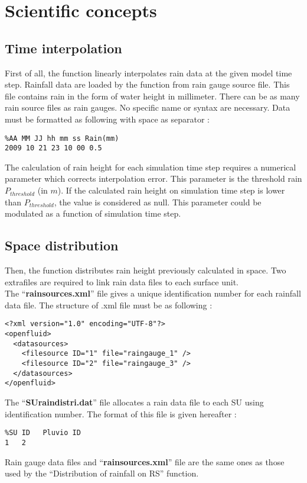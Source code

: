 \section{Scientific concepts}
\subsection{Time interpolation}
First of all, the function linearly interpolates rain data at the given model time step. Rainfall data are loaded by the function from rain gauge source file. This file contains rain in the form of water height in millimeter. There can be as many rain source files as rain gauges. No specific name or syntax are necessary. Data must be formatted as following with space as separator :
\begin{verbatim}
%AA MM JJ hh mm ss Rain(mm)
2009 10 21 23 10 00 0.5
\end{verbatim}

The calculation of rain height for each simulation time step requires a numerical parameter which corrects interpolation error. This parameter is the threshold rain $P_{threshold}$ (in $m$). If the calculated rain height on simulation time step is lower than $P_{threshold}$, the value is considered as null. This parameter could be modulated as a function of simulation time step.


\subsection{Space distribution}
Then, the function distributes rain height previously calculated in space. Two extrafiles are required to link rain data files to each surface unit.\\

The ``\textbf{rainsources.xml}'' file gives a unique identification number for each rainfall data file. The structure of .xml file must be as following :
\begin{verbatim}
<?xml version="1.0" encoding="UTF-8"?>
<openfluid>
  <datasources>
    <filesource ID="1" file="raingauge_1" />
    <filesource ID="2" file="raingauge_3" />
  </datasources>
</openfluid>
\end{verbatim}

The ``\textbf{SUraindistri.dat}'' file allocates a rain data file to each SU using identification number. The format of this file is given hereafter :
\vspace{-3.5mm}
\begin{verbatim}
%SU ID   Pluvio ID
1   2
\end{verbatim}

Rain gauge data files and ``\textbf{rainsources.xml}'' file are the same ones as those used by the ``Distribution of rainfall on RS'' function.
